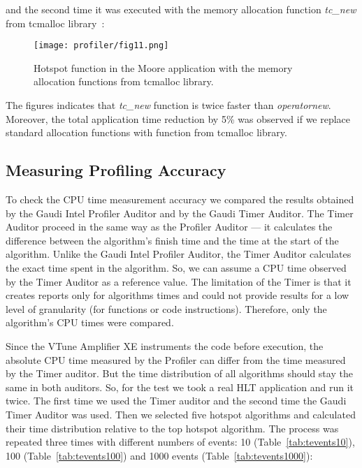 \noindent and the second time it was executed with the memory allocation function {\it
tc\_new} from tcmalloc library~\cite{perftools}:

\begin{figure}[H]
\texttt{[image: profiler/fig11.png]}
\caption{Hotspot function in the Moore application with the memory allocation functions from tcmalloc 
library.}
\label{fig11}
\end{figure}

The figures indicates that {\it tc\_new} function is twice faster than {\it
operatornew}. Moreover, the total application time reduction by 5\% was
observed if we replace standard allocation functions with function from
tcmalloc library.

\subsection{Measuring Profiling Accuracy}

To check the CPU time measurement accuracy we compared the results obtained by
the Gaudi Intel Profiler Auditor and by the Gaudi Timer Auditor. The Timer
Auditor proceed  in the same way as the Profiler Auditor --- it calculates the
difference between the algorithm’s finish time and the time at the start of the
algorithm. Unlike the Gaudi Intel Profiler Auditor, the Timer Auditor
calculates the exact time spent in the algorithm. So, we can assume a CPU time
observed by the Timer Auditor as a reference value. The limitation of the Timer
is that it creates reports only for algorithms times  and could not provide
results for a low level of granularity (for functions or code instructions).
Therefore, only the algorithm’s CPU times were compared.

Since the VTune Amplifier XE instruments the code before execution, the
absolute CPU time measured by the Profiler can differ from the time measured by
the Timer auditor.  But the time distribution of all algorithms should stay the
same in both auditors.  So, for the test we took a real HLT application and run
it twice. The first time we used the Timer auditor and the second time the
Gaudi Timer Auditor was used. Then we selected five hotspot algorithms and
calculated their time distribution relative to the top hotspot algorithm. The
process was repeated three times with different numbers of events: 10
(Table~\ref{tab:tevents10}), 100 (Table~\ref{tab:tevents100}) and 1000 events
(Table~\ref{tab:tevents1000}):

